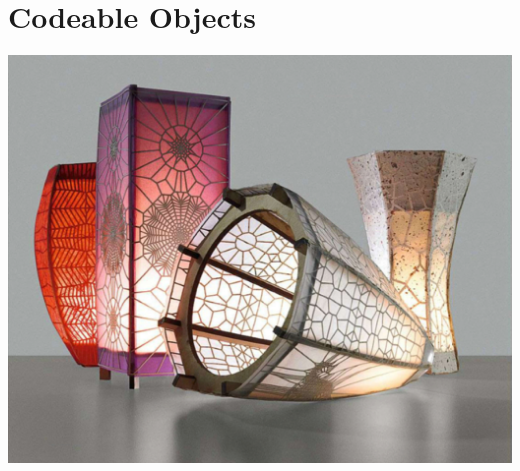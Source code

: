 \chapter{Codeable Objects}

\begin{center}
\includegraphics[width=\columnwidth]{images/finished_lamps.png}
\end{center}

